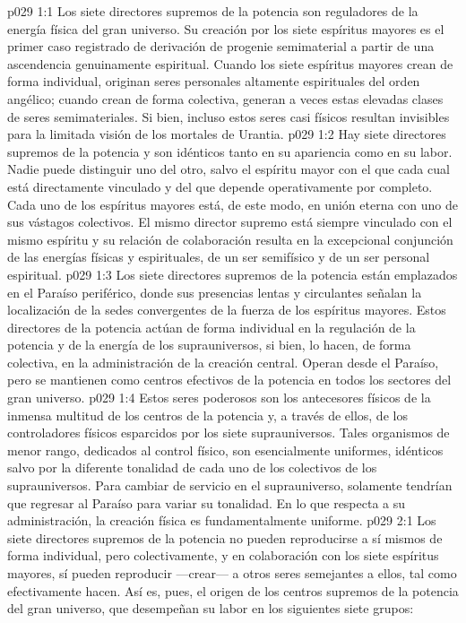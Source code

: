 \vs p029 1:1 Los siete directores supremos de la potencia son reguladores de la energía física del gran universo. Su creación por los siete espíritus mayores es el primer caso registrado de derivación de progenie semimaterial a partir de una ascendencia genuinamente espiritual. Cuando los siete espíritus mayores crean de forma individual, originan seres personales altamente espirituales del orden angélico; cuando crean de forma colectiva, generan a veces estas elevadas clases de seres semimateriales. Si bien, incluso estos seres casi físicos resultan invisibles para la limitada visión de los mortales de Urantia.
\vs p029 1:2 Hay siete directores supremos de la potencia y son idénticos tanto en su apariencia como en su labor. Nadie puede distinguir uno del otro, salvo el espíritu mayor con el que cada cual está directamente vinculado y del que depende operativamente por completo. Cada uno de los espíritus mayores está, de este modo, en unión eterna con uno de sus vástagos colectivos. El mismo director supremo está siempre vinculado con el mismo espíritu y su relación de colaboración resulta en la excepcional conjunción de las energías físicas y espirituales, de un ser semifísico y de un ser personal espiritual.
\vs p029 1:3 Los siete directores supremos de la potencia están emplazados en el Paraíso periférico, donde sus presencias lentas y circulantes señalan la localización de la sedes convergentes de la fuerza de los espíritus mayores. Estos directores de la potencia actúan de forma individual en la regulación de la potencia y de la energía de los suprauniversos, si bien, lo hacen, de forma colectiva, en la administración de la creación central. Operan desde el Paraíso, pero se mantienen como centros efectivos de la potencia en todos los sectores del gran universo.
\vs p029 1:4 Estos seres poderosos son los antecesores físicos de la inmensa multitud de los centros de la potencia y, a través de ellos, de los controladores físicos esparcidos por los siete suprauniversos. Tales organismos de menor rango, dedicados al control físico, son esencialmente uniformes, idénticos salvo por la diferente tonalidad de cada uno de los colectivos de los suprauniversos. Para cambiar de servicio en el suprauniverso, solamente tendrían que regresar al Paraíso para variar su tonalidad. En lo que respecta a su administración, la creación física es fundamentalmente uniforme.
\vs p029 2:1 Los siete directores supremos de la potencia no pueden reproducirse a sí mismos de forma individual, pero colectivamente, y en colaboración con los siete espíritus mayores, sí pueden reproducir ---crear--- a otros seres semejantes a ellos, tal como efectivamente hacen. Así es, pues, el origen de los centros supremos de la potencia del gran universo, que desempeñan su labor en los siguientes siete grupos:
